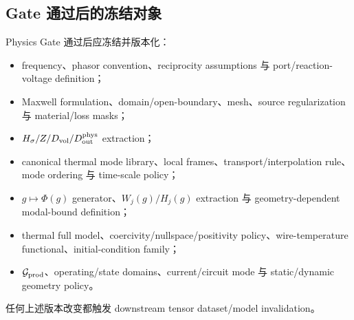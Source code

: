 \subsection{Gate 通过后的冻结对象}
Physics Gate 通过后应冻结并版本化：
\begin{itemize}
  \item frequency、phasor convention、reciprocity assumptions 与 port/reaction-voltage definition；
  \item Maxwell formulation、domain/open-boundary、mesh、source regularization 与 material/loss masks；
  \item $H_\sigma/Z/D_{\rm vol}/D_{\rm out}^{\rm phys}$ extraction；
  \item canonical thermal mode library、local frames、transport/interpolation rule、mode ordering 与 time-scale policy；
  \item $g\mapsto\Phi(g)$ generator、$W_j(g)/H_j(g)$ extraction 与 geometry-dependent modal-bound definition；
  \item thermal full model、coercivity/nullspace/positivity policy、wire-temperature functional、initial-condition family；
  \item $\mathcal G_{\rm prod}$、operating/state domains、current/circuit mode 与 static/dynamic geometry policy。
\end{itemize}
任何上述版本改变都触发 downstream tensor dataset/model invalidation。
